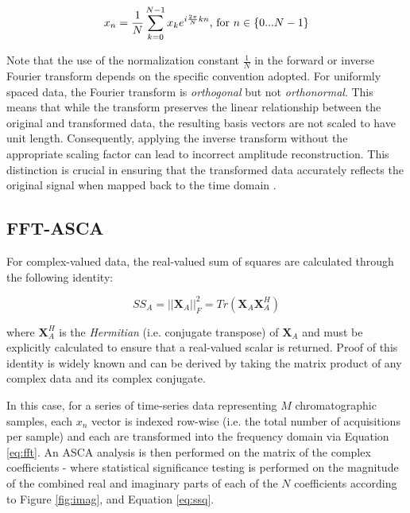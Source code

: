 \documentclass[preprint,12pt]{elsarticle}
\begin{document}
\begin{equation}\label{eq:ifft}
    x_n = \frac{1}{N} \sum_{k=0}^{N-1} x_k e^{i \frac{2\pi}{N} kn}\textnormal{, for } n \in \{0...N-1\}
\end{equation}

Note that the use of the normalization constant $\frac{1}{N}$ in the forward or inverse Fourier transform depends on the specific convention adopted. For uniformly spaced data, the Fourier transform is \textit{orthogonal} but not \textit{orthonormal}. This means that while the transform preserves the linear relationship between the original and transformed data, the resulting basis vectors are not scaled to have unit length. Consequently, applying the inverse transform without the appropriate scaling factor can lead to incorrect amplitude reconstruction. This distinction is crucial in ensuring that the transformed data accurately reflects the original signal when mapped back to the time domain \cite{armstrong2023direct}.

\subsection{FFT-ASCA}\label{sec:fftasca}

For complex-valued data, the real-valued sum of squares are calculated through the following identity:

\begin{equation}\label{eq:ssq}
    SS_A = ||\mathbf{X}_A||^2_F = Tr(\mathbf{X}_A\mathbf{X}_A^H)
\end{equation}

\noindent where $\mathbf{X}^H_A$ is the \textit{Hermitian} (i.e. conjugate transpose) of $\mathbf{X}_A$ and must be explicitly calculated to ensure that a real-valued scalar is returned. Proof of this identity is widely known and can be derived by taking the matrix product of any complex data and its complex conjugate.

In this case, for a series of time-series data representing $M$ chromatographic samples, each $x_n$ vector is indexed row-wise (i.e. the total number of acquisitions per sample) and each are transformed into the frequency domain via Equation \ref{eq:fft}. An ASCA analysis is then performed on the matrix of the complex coefficients - where statistical significance testing is performed on the magnitude of the combined real and imaginary parts of each of the $N$ coefficients according to Figure \ref{fig:imag}, and Equation \ref{eq:ssq}.
\end{document}
